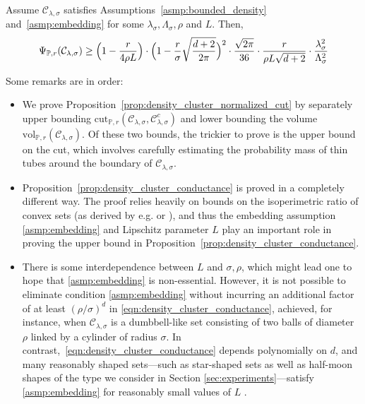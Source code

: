 \documentclass[11pt,twoside]{article}
\newcommand{\1}{\mathbf{1}}
\newcommand{\mc}[1]{\mathcal{#1}}
\newcommand{\Pbb}{\mathbb{P}}
\newcommand{\vol}{\mathrm{vol}}
\newcommand{\cut}{\mathrm{cut}}
\begin{document}
\begin{proposition}
	\label{prop:density_cluster_conductance}
	Assume $\mc{C}_{\lambda,\sigma}$ satisfies Assumptions~\ref{asmp:bounded_density} and~\ref{asmp:embedding} for some $\lambda_{\sigma}, \Lambda_{\sigma}, \rho$ and $L$. Then,
	\begin{equation}
	\label{eqn:density_cluster_conductance}
	\Psi_{\Pbb,r}(\mc{C}_{\lambda,\sigma}) \geq \Bigl(1 - \frac{r}{4\rho L}\Bigr) \cdot \Bigl(1 - \frac{r}{\sigma}\sqrt{\frac{d + 2}{2\pi}}\Bigr)^2 \cdot \frac{\sqrt{2\pi}}{36} \cdot \frac{r}{\rho L \sqrt{d + 2}} \cdot \frac{\lambda_{\sigma}^2}{\Lambda_{\sigma}^2}
	\end{equation}
\end{proposition}
Some remarks are in order:
\begin{itemize}
	\item We prove Proposition~\ref{prop:density_cluster_normalized_cut} by separately upper bounding $\cut_{\Pbb,r}(\mc{C}_{\lambda,\sigma}, \mc{C}_{\lambda,\sigma}^c)$ and lower bounding the volume $\vol_{\Pbb,r}(\mc{C}_{\lambda,\sigma})$. Of these two bounds, the trickier to prove is the upper bound on the cut, which involves carefully estimating the probability mass of thin tubes around the boundary of $\mc{C}_{\lambda,\sigma}$. 
	\item Proposition~\ref{prop:density_cluster_conductance} is proved in a completely different way. The proof relies heavily on bounds on the isoperimetric ratio of convex sets (as derived by e.g. \cite{lovasz1990} or \cite{dyer1991}), and thus the embedding assumption \ref{asmp:embedding} and Lipschitz parameter $L$
	play an important role in proving the upper bound in Proposition~\ref{prop:density_cluster_conductance}. 
	\item There is some interdependence between $L$ and $\sigma,\rho$, which might lead one to hope that \ref{asmp:embedding} is
	non-essential. However, it is not possible to eliminate condition \ref{asmp:embedding} without incurring an additional factor of at least
	$(\rho/\sigma)^d$ in \eqref{eqn:density_cluster_conductance}, achieved, for
	instance, when $\mc{C}_{\lambda,\sigma}$ is a dumbbell-like set consisting of two balls of diameter $\rho$ linked by a cylinder of radius $\sigma$. In contrast,~\eqref{eqn:density_cluster_conductance} depends polynomially on $d$, and many reasonably shaped sets---such as star-shaped sets as well as half-moon shapes of the type we consider in Section \ref{sec:experiments}---satisfy \ref{asmp:embedding} for reasonably small values of $L$ \citep{abbasi-yadkori2016a, abbasi-yadkori2016}.
\end{itemize}
\end{document}
